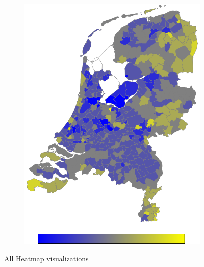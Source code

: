 \documentclass[a4paper,twoside,11pt]{article}
\begin{document}
\begin{figure}[h]
\begin{subfigure}[b]{0.118\textwidth}
                \includegraphics[width=\textwidth]{Heatmaps/HeatMap16.png}
                \caption{}
                \label{fig:Widowed}
        \end{subfigure} \newline
        \caption{All Heatmap visualizations}\label{fig:HeatMaps}
\end{figure}
\end{document}
